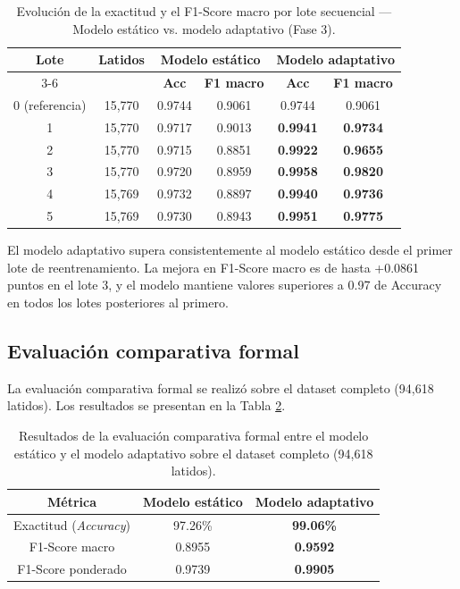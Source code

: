 \begin{table}[h]
\caption{Evolución de la exactitud y el F1-Score macro por lote secuencial — Modelo estático vs. modelo adaptativo (Fase 3).}
\label{T_fase3}
\begin{center}
\begin{tabular}{cccccc}
\hline
\multirow{2}{*}{\textbf{Lote}} & \multirow{2}{*}{\textbf{Latidos}} &
\multicolumn{2}{c}{\textbf{Modelo estático}} &
\multicolumn{2}{c}{\textbf{Modelo adaptativo}} \\
\cline{3-6}
& & \textbf{Acc} & \textbf{F1 macro} & \textbf{Acc} & \textbf{F1 macro} \\
\hline
0 (referencia) & 15,770 & 0.9744 & 0.9061 & 0.9744 & 0.9061 \\
1              & 15,770 & 0.9717 & 0.9013 & \textbf{0.9941} & \textbf{0.9734} \\
2              & 15,770 & 0.9715 & 0.8851 & \textbf{0.9922} & \textbf{0.9655} \\
3              & 15,770 & 0.9720 & 0.8959 & \textbf{0.9958} & \textbf{0.9820} \\
4              & 15,769 & 0.9732 & 0.8897 & \textbf{0.9940} & \textbf{0.9736} \\
5              & 15,769 & 0.9730 & 0.8943 & \textbf{0.9951} & \textbf{0.9775} \\
\hline
\end{tabular}
\end{center}
\end{table}

El modelo adaptativo supera consistentemente al modelo estático desde el primer lote de reentrenamiento. La mejora en F1-Score macro es de hasta +0.0861 puntos en el lote 3, y el modelo mantiene valores superiores a 0.97 de Accuracy en todos los lotes posteriores al primero.

\subsection{Evaluación comparativa formal}

La evaluación comparativa formal se realizó sobre el dataset completo (94,618 latidos). Los resultados se presentan en la Tabla \ref{T_fase4}.

\begin{table}[h]
\caption{Resultados de la evaluación comparativa formal entre el modelo estático y el modelo adaptativo sobre el dataset completo (94,618 latidos).}
\label{T_fase4}
\begin{center}
\begin{tabular}{ccc}
\hline
\textbf{Métrica} & \textbf{Modelo estático} & \textbf{Modelo adaptativo} \\ \hline
Exactitud (\textit{Accuracy}) & 97.26\% & \textbf{99.06\%} \\
F1-Score macro                & 0.8955  & \textbf{0.9592} \\
F1-Score ponderado            & 0.9739  & \textbf{0.9905} \\
\hline
\end{tabular}
\end{center}
\end{table}


